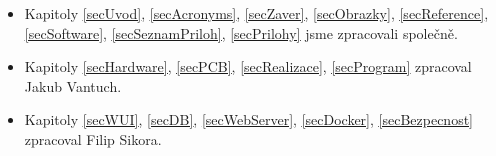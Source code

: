 \documentclass[czech,12pt,a4paper]{article}
\begin{document}
\begin{itemize}
	\item Kapitoly \underline{\ref{secUvod}}, \underline{\ref{secAcronyms}}, \underline{\ref{secZaver}}, \underline{\ref{secObrazky}}, \underline{\ref{secReference}}, \underline{\ref{secSoftware}}, \underline{\ref{secSeznamPriloh}}, \underline{\ref{secPrilohy}} jsme zpracovali společně. 
	\item Kapitoly \underline{\ref{secHardware}}, \underline{\ref{secPCB}}, \underline{\ref{secRealizace}}, \underline{\ref{secProgram}} zpracoval Jakub Vantuch.
	\item Kapitoly \underline{\ref{secWUI}}, \underline{\ref{secDB}}, \underline{\ref{secWebServer}}, \underline{\ref{secDocker}}, \underline{\ref{secBezpecnost}} zpracoval Filip Sikora.
\end{itemize}


\clearpage
\end{document}

